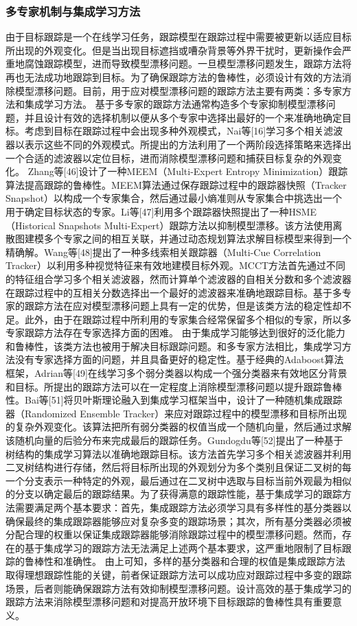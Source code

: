 \documentclass[a4paper,zihao=-4]{article}
\begin{document}
\subsubsection{多专家机制与集成学习方法}
由于目标跟踪是一个在线学习任务，跟踪模型在跟踪过程中需要被更新以适应目标所出现的外观变化。但是当出现目标遮挡或嘈杂背景等外界干扰时，更新操作会严重地腐蚀跟踪模型，进而导致模型漂移问题。一旦模型漂移问题发生，跟踪方法将再也无法成功地跟踪到目标。为了确保跟踪方法的鲁棒性，必须设计有效的方法消除模型漂移问题。目前，用于应对模型漂移问题的跟踪方法主要有两类：多专家方法和集成学习方法。
基于多专家的跟踪方法通常构造多个专家抑制模型漂移问题，并且设计有效的选择机制以便从多个专家中选择出最好的一个来准确地确定目标。考虑到目标在跟踪过程中会出现多种外观模式，Nai等[16]学习多个相关滤波器以表示这些不同的外观模式。所提出的方法利用了一个两阶段选择策略来选择出一个合适的滤波器以定位目标，进而消除模型漂移问题和捕获目标复杂的外观变化。 Zhang等[46]设计了一种MEEM（Multi-Expert Entropy Minimization）跟踪算法提高跟踪的鲁棒性。MEEM算法通过保存跟踪过程中的跟踪器快照（Tracker Snapshot）以构成一个专家集合，然后通过最小熵准则从专家集合中挑选出一个用于确定目标状态的专家。Li等[47]利用多个跟踪器快照提出了一种HSME（Historical Snapshots Multi-Expert）跟踪方法以抑制模型漂移。该方法使用离散图建模多个专家之间的相互关联，并通过动态规划算法求解目标模型来得到一个精确解。Wang等[48]提出了一种多线索相关跟踪器（Multi-Cue Correlation Tracker）以利用多种视觉特征来有效地建模目标外观。MCCT方法首先通过不同的特征组合学习多个相关滤波器，然而计算单个滤波器的自相关分数和多个滤波器在跟踪过程中的互相关分数选择出一个最好的滤波器来准确地跟踪目标。基于多专家的跟踪方法在应对模型漂移问题上具有一定的优势，但是该类方法的稳定性却不足。此外，由于在跟踪过程中所利用的专家集合经常保留多个相似的专家，所以多专家跟踪方法存在专家选择方面的困难。
由于集成学习能够达到很好的泛化能力和鲁棒性，该类方法也被用于解决目标跟踪问题。和多专家方法相比，集成学习方法没有专家选择方面的问题，并且具备更好的稳定性。基于经典的Adaboost算法框架，Adrian等[49]在线学习多个弱分类器以构成一个强分类器来有效地区分背景和目标。所提出的跟踪方法可以在一定程度上消除模型漂移问题以提升跟踪鲁棒性。Bai等[51]将贝叶斯理论融入到集成学习框架当中，设计了一种随机集成跟踪器（Randomized Ensemble Tracker）来应对跟踪过程中的模型漂移和目标所出现的复杂外观变化。该算法把所有弱分类器的权值当成一个随机向量，然后通过求解该随机向量的后验分布来完成最后的跟踪任务。Gundogdu等[52]提出了一种基于树结构的集成学习算法以准确地跟踪目标。该方法首先学习多个相关滤波器并利用二叉树结构进行存储，然后将目标所出现的外观划分为多个类别且保证二叉树的每一个分支表示一种特定的外观，最后通过在二叉树中选取与目标当前外观最为相似的分支以确定最后的跟踪结果。为了获得满意的跟踪性能，基于集成学习的跟踪方法需要满足两个基本要求：首先，集成跟踪方法必须学习具有多样性的基分类器以确保最终的集成跟踪器能够应对复杂多变的跟踪场景；其次，所有基分类器必须被分配合理的权重以保证集成跟踪器能够消除跟踪过程中的模型漂移问题。然而，存在的基于集成学习的跟踪方法无法满足上述两个基本要求，这严重地限制了目标跟踪的鲁棒性和准确性。
由上可知，多样的基分类器和合理的权值是集成跟踪方法取得理想跟踪性能的关键，前者保证跟踪方法可以成功应对跟踪过程中多变的跟踪场景，后者则能确保跟踪方法有效抑制模型漂移问题。设计高效的基于集成学习的跟踪方法来消除模型漂移问题和对提高开放环境下目标跟踪的鲁棒性具有重要意义。
\end{document}
